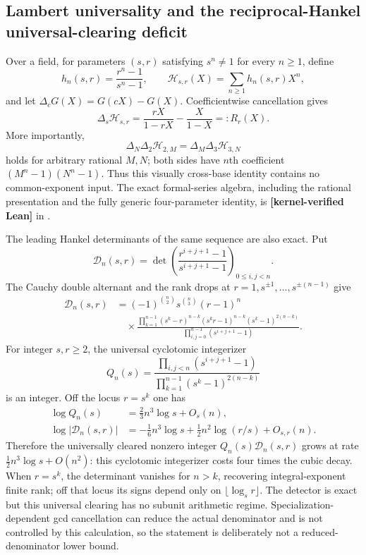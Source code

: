 \documentclass[11pt,oneside]{article}
\theoremstyle{definition}
\theoremstyle{remark}
\newcommand{\lean}[1]{\texttt{\detokenize{#1}}}
\newcommand{\statuslean}{\textcolor{leanblue}{\textbf{[kernel-verified Lean]}}}
\begin{document}
\subsection{Lambert universality and the reciprocal-Hankel universal-clearing deficit}
\label{crit:lambert-hankel}

Over a field, for parameters $(s,r)$ satisfying $s^n\ne1$ for every $n\ge1$, define
\[
 h_n(s,r)=\frac{r^n-1}{s^n-1},\qquad
 \mathcal H_{s,r}(X)=\sum_{n\ge1}h_n(s,r)X^n,
\]
and let $\Delta_cG(X)=G(cX)-G(X)$.  Coefficientwise cancellation gives
\begin{equation}
 \Delta_s\mathcal H_{s,r}
 =\frac{rX}{1-rX}-\frac{X}{1-X}=:R_r(X).
 \label{crit:eq-lambert-cocycle}
\end{equation}
More importantly,
\begin{equation}
 \boxed{
 \Delta_N\Delta_2\mathcal H_{2,M}
 =\Delta_M\Delta_3\mathcal H_{3,N}}
 \label{crit:eq-universal-double-cocycle}
\end{equation}
holds for arbitrary rational $M,N$; both sides have $n$th coefficient
$(M^n-1)(N^n-1)$.  Thus this visually cross-base identity contains no common-exponent input.
The exact formal-series algebra, including the rational presentation and the fully generic
four-parameter identity, is \statuslean{} in \lean{LambertCocycleFinite}.

The leading Hankel determinants of the same sequence are also exact.  Put
\[
 \mathcal D_n(s,r)=\det\left(\frac{r^{i+j+1}-1}{s^{i+j+1}-1}
                       \right)_{0\le i,j<n}.
\]
The Cauchy double alternant and the rank drops at $r=1,s^{\pm1},\ldots,s^{\pm(n-1)}$
give
\begin{equation}
\begin{split}
 \mathcal D_n(s,r)
 &=(-1)^{\binom n2}s^{\binom n3}(r-1)^n\\
 &\quad\times
 \frac{\displaystyle\prod_{k=1}^{n-1}
 (s^k-r)^{n-k}(s^kr-1)^{n-k}(s^k-1)^{2(n-k)}}
 {\displaystyle\prod_{i,j=0}^{n-1}(s^{i+j+1}-1)}.
\end{split}
 \label{crit:eq-hankel-product}
\end{equation}
For integer $s,r\ge2$, the universal cyclotomic integerizer
\[
 Q_n(s)=
 \frac{\prod_{i,j<n}(s^{i+j+1}-1)}
      {\prod_{k=1}^{n-1}(s^k-1)^{2(n-k)}}
\]
is an integer.  Off the locus $r=s^k$ one has
\begin{align}
 \log Q_n(s)&=\frac23n^3\log s+O_s(n),
 \label{crit:eq-hankel-denominator}\\
 \log|\mathcal D_n(s,r)|
 &=-\frac16n^3\log s+\frac12n^2\log(r/s)+O_{s,r}(n).
 \label{crit:eq-hankel-smallness}
\end{align}
Therefore the universally cleared nonzero integer $Q_n(s)\mathcal D_n(s,r)$ grows at rate
$\frac12n^3\log s+O(n^2)$: this cyclotomic integerizer costs four times the cubic decay.
When $r=s^k$, the determinant vanishes for $n>k$, recovering integral-exponent finite rank;
off that locus its signs depend only on $\lfloor\log_s r\rfloor$.  The detector is exact but
this universal clearing has no subunit arithmetic regime.  Specialization-dependent gcd
cancellation can reduce the actual denominator and is not controlled by this calculation,
so the statement is deliberately not a reduced-denominator lower bound.
\end{document}
